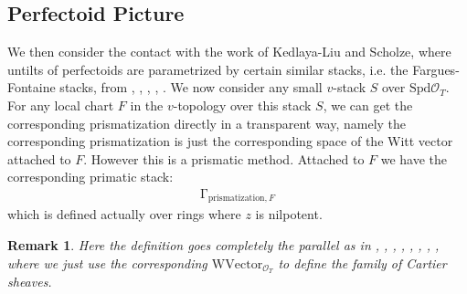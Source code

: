 \documentclass[12pt]{article}
\newtheorem{remark}{Remark}
\theoremstyle{definition}
\begin{document}
\subsection{Perfectoid Picture}
\noindent We then consider the contact with the work of Kedlaya-Liu and Scholze, where untilts of perfectoids are parametrized by certain similar stacks, i.e. the Fargues-Fontaine stacks, from \cite{KLI}, \cite{KLII}, \cite{SchII}, \cite{SchIII}, \cite{SchIV}. We now consider any small $v$-stack $S$ over $\mathrm{Spd}\mathcal{O}_T$. For any local chart ${F}$ in the $v$-topology over this stack $S$, we can get the corresponding prismatization directly in a transparent way, namely the corresponding prismatization is just the corresponding space of the Witt vector attached to $F$. However this is a prismatic method. Attached to $F$ we have the corresponding primatic stack:
\begin{align}
\mathrm{\Gamma}_{\mathrm{prismatization},F}
\end{align}  
which is defined actually over rings where $z$ is nilpotent. 

\begin{remark}
Here the definition goes completely the parallel as in \cite{BSI}, \cite{BLI}, \cite{DI}, \cite{SchI}, \cite{ALBRCS}, \cite{TI}, \cite{TII}, \cite{TIII}, \cite{TVI} where we just use the corresponding $\mathrm{WVector}_{\mathcal{O}_T}$ to define the family of Cartier sheaves. 
\end{remark}
\end{document}
